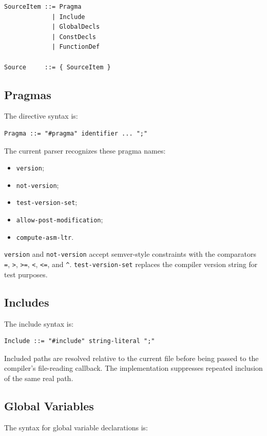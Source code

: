 \documentclass[12pt,oneside]{article}
\begin{document}
\begin{verbatim}
SourceItem ::= Pragma
             | Include
             | GlobalDecls
             | ConstDecls
             | FunctionDef

Source     ::= { SourceItem }
\end{verbatim}

\subsection{Pragmas}
The directive syntax is:

\begin{verbatim}
Pragma ::= "#pragma" identifier ... ";"
\end{verbatim}

The current parser recognizes these pragma names:

\begin{itemize}
\item \verb|version|;
\item \verb|not-version|;
\item \verb|test-version-set|;
\item \verb|allow-post-modification|;
\item \verb|compute-asm-ltr|.
\end{itemize}

\verb|version| and \verb|not-version| accept semver-style constraints with the
comparators \verb|=|, \verb|>|, \verb|>=|, \verb|<|, \verb|<=|, and \verb|^|.
\verb|test-version-set| replaces the compiler version string for test purposes.

\subsection{Includes}
The include syntax is:

\begin{verbatim}
Include ::= "#include" string-literal ";"
\end{verbatim}

Included paths are resolved relative to the current file before being passed to
the compiler's file-reading callback. The implementation suppresses repeated
inclusion of the same real path.

\subsection{Global Variables}
The syntax for global variable declarations is:
\end{document}
